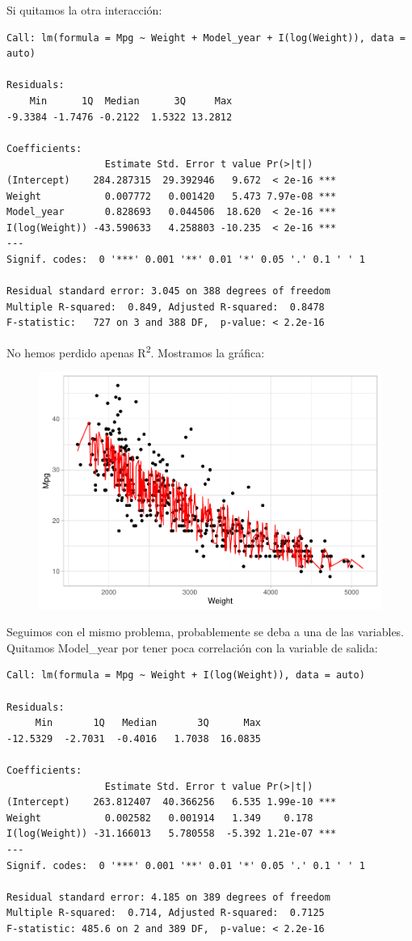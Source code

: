 Si quitamos la otra interacción:
\begin{verbatim}
Call: lm(formula = Mpg ~ Weight + Model_year + I(log(Weight)), data = auto)

Residuals:
    Min      1Q  Median      3Q     Max 
-9.3384 -1.7476 -0.2122  1.5322 13.2812 

Coefficients:
                 Estimate Std. Error t value Pr(>|t|)    
(Intercept)    284.287315  29.392946   9.672  < 2e-16 ***
Weight           0.007772   0.001420   5.473 7.97e-08 ***
Model_year       0.828693   0.044506  18.620  < 2e-16 ***
I(log(Weight)) -43.590633   4.258803 -10.235  < 2e-16 ***
---
Signif. codes:  0 '***' 0.001 '**' 0.01 '*' 0.05 '.' 0.1 ' ' 1

Residual standard error: 3.045 on 388 degrees of freedom
Multiple R-squared:  0.849, Adjusted R-squared:  0.8478 
F-statistic:   727 on 3 and 388 DF,  p-value: < 2.2e-16
\end{verbatim}

No hemos perdido apenas R\textsuperscript{2}. Mostramos la gráfica:

\begin{figure}[H]\includegraphics[width=.9\linewidth]{img/Regresion_files/figure-latex/unnamed-chunk-21-1} \caption{}\end{figure}

Seguimos con el mismo problema, probablemente se deba a una de las variables. Quitamos Model\_year por tener poca correlación con la variable de salida:

\begin{verbatim}
Call: lm(formula = Mpg ~ Weight + I(log(Weight)), data = auto)

Residuals:
     Min       1Q   Median       3Q      Max 
-12.5329  -2.7031  -0.4016   1.7038  16.0835 

Coefficients:
                 Estimate Std. Error t value Pr(>|t|)    
(Intercept)    263.812407  40.366256   6.535 1.99e-10 ***
Weight           0.002582   0.001914   1.349    0.178    
I(log(Weight)) -31.166013   5.780558  -5.392 1.21e-07 ***
---
Signif. codes:  0 '***' 0.001 '**' 0.01 '*' 0.05 '.' 0.1 ' ' 1

Residual standard error: 4.185 on 389 degrees of freedom
Multiple R-squared:  0.714, Adjusted R-squared:  0.7125 
F-statistic: 485.6 on 2 and 389 DF,  p-value: < 2.2e-16
\end{verbatim}

